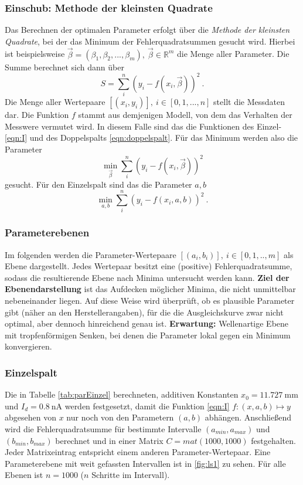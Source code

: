 \subsubsection{Einschub: Methode der kleinsten Quadrate}
Das Berechnen der optimalen Parameter erfolgt über die \textit{Methode der kleinsten Quadrate}, bei der das Minimum der Fehlerquadratsummen gesucht wird.
Hierbei ist beispielsweise $\vec{\beta} = (\beta_1, \beta_2, ..., \beta_m),\:\vec{\beta}\in\mathbb{R}^m$ die Menge aller Parameter.
Die Summe berechnet sich dann über
\begin{equation}
    S = \sum_i^n (y_i - f(x_i, \vec{\beta}))^2 \:.
    \label{eqn:fehlerquadratsumme}
\end{equation}
Die Menge aller Wertepaare $[(x_i, y_i)],\: i\in[0, 1, ..., n]$ stellt die Messdaten dar. Die Funktion $f$ stammt aus demjenigen Modell, von dem das Verhalten
der Messwere vermutet wird.
In diesem Falle sind das die Funktionen des Einzel- \eqref{eqn:I} und des Doppelspalts \eqref{eqn:doppelspalt}.
Für das Minimum werden also die Parameter
\begin{equation}
    \min\limits_{\vec{\beta}} \sum_i^n (y_i - f(x_i, \vec{\beta}))^2
\end{equation}
gesucht. Für den Einzelspalt sind das die Parameter $a, b$
\begin{equation}
    \min\limits_{a, b} \sum_i^n (y_i - f(x_i, a, b))^2 \:.
\end{equation}

\subsubsection{Parameterebenen}
Im folgenden werden die Parameter-Wertepaare $[(a_i,b_i)],\:i\in[0,1,..,m]$ als Ebene dargestellt.
Jedes Wertepaar besitzt eine (positive) Fehlerquadratsumme, sodass die resultierende Ebene nach Minima untersucht werden kann.
\textbf{Ziel der Ebenendarstellung} ist das Aufdecken möglicher Minima, die nicht unmittelbar nebeneinander liegen.
Auf diese Weise wird überprüft, ob es plausible Parameter gibt (näher an den Herstellerangaben), für die die Ausgleichskurve zwar nicht optimal,
aber dennoch hinreichend genau ist.
\textbf{Erwartung:} Wellenartige Ebene mit tropfenförmigen Senken, bei denen die Parameter lokal gegen ein Minimum konvergieren.

\subsubsection{Einzelspalt}
Die in Tabelle \ref{tab:parEinzel} berechneten, additiven Konstanten $x_0 = \SI{11.727}{\milli\meter}$ und $I_d = \SI{0.8}{\nano\ampere}$ werden festgesetzt,
damit die Funktion \eqref{eqn:I} $f:(x,a,b)\mapsto y$ abgesehen von $x$ nur noch von den Parametern $(a,b)$ abhängen.
Anschließend wird die Fehlerquadratsumme für bestimmte Intervalle $(a_{min}, a_{max})$ und $(b_{min}, b_{max})$ berechnet und in einer Matrix $C = mat(1000, 1000)$ festgehalten.
Jeder Matrixeintrag entspricht einem anderen Parameter-Wertepaar.
Eine Parameterebene mit weit gefassten Intervallen ist in \ref{fig:ls1} zu sehen.
Für alle Ebenen ist $n = 1000$ ($n$ Schritte im Intervall).

